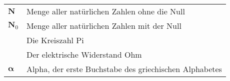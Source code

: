 \begin{table}[h!]
\noindent\begin{tabular}{@{}p{2.5cm}l}
$\mathbf{N}$        & Menge aller natürlichen Zahlen ohne die Null \\
$\mathbf{N}_{0}$    & Menge aller natürlichen Zahlen mit der Null \\
\bm{$\pi$}          & Die Kreiszahl Pi \\
\bm{$\Omega$}       & Der elektrische Widerstand Ohm \\
$\boldsymbol\alpha$ & Alpha, der erste Buchstabe des griechischen Alphabetes \\
\end{tabular}
\end{table}
